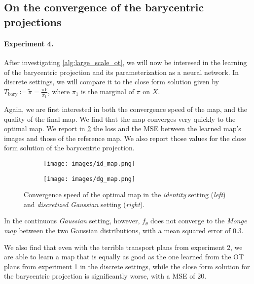 \documentclass[a4paper,11pt]{article}
\newcommand{\1}{\mathbbm{1}}
\begin{document}
\subsection{On the convergence of the barycentric projections}

\paragraph{Experiment 4.}After investigating \cref{alg:large_scale_ot}, we will now be interesed in the learning of the barycentric projection and its parameterization as a neural network. In discrete settings, we will compare it to the close form solution given by $T_{\mathrm{bary}} \coloneq \widetilde{\pi} = \frac{\pi Y}{\pi_1}$, where $\pi_1$ is the marginal of $\pi$ on $X$.

Again, we are first interested in both the convergence speed of the map, and the quality of the final map. We find that the map converges very quickly to the optimal map. We report in \cref{fig:exp4} the loss and the MSE between the learned map's images and those of the reference map. We also report those values for the close form solution of the barycentric projection.

\begin{figure}[H]
    \centering
    \begin{subfigure}{0.48\linewidth}
        \centering
        \texttt{[image: images/id\_map.png]}
    \end{subfigure}%
    \hfill
    \begin{subfigure}{0.48\linewidth}
        \centering
        \texttt{[image: images/dg\_map.png]}
        \label{fig:exp4_dg1}
    \end{subfigure}
    \caption{Convergence speed of the optimal map in the \emph{identity} setting (\emph{left}) and \emph{discretized Gaussian} setting (\emph{right}).}
    \label{fig:exp4}
\end{figure}

In the continuous \emph{Gaussian} setting, however, $f_{\theta}$ does not converge to the \emph{Monge map} between the two Gaussian distributions, with a mean squared error of $0.3$.

We also find that even with the terrible transport plans from experiment 2, we are able to learn a map that is equally as good as the one learned from the OT plans from experiment 1 in the discrete settings, while the close form solution for the barycentric projection is significantly worse, with a MSE of $20$.
\end{document}
